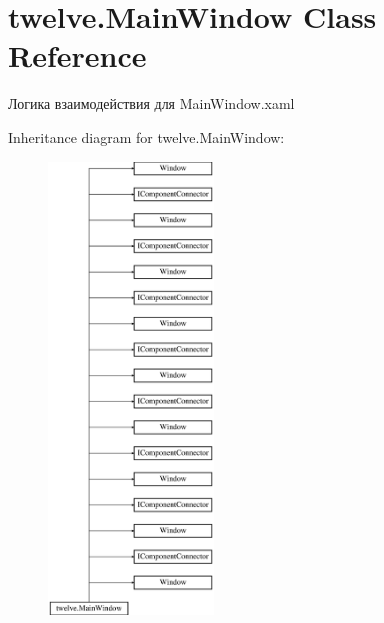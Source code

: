 \hypertarget{classtwelve_1_1_main_window}{}\section{twelve.\+Main\+Window Class Reference}
\label{classtwelve_1_1_main_window}


Логика взаимодействия для Main\+Window.\+xaml  


Inheritance diagram for twelve.\+Main\+Window\+:\begin{figure}[H]
\begin{center}
\leavevmode
\includegraphics[height=12.000000cm]{classtwelve_1_1_main_window}
\end{center}
\end{figure}
